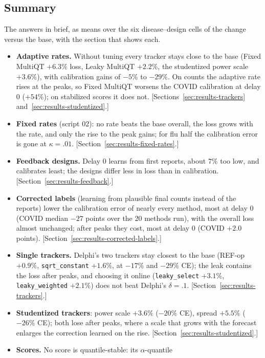 \documentclass[11pt,a4paper]{article}
\theoremstyle{definition}
\theoremstyle{remark}
\begin{document}
\subsection{Summary}
\label{sec:results-summary}
The answers in brief, as means over the six disease--design cells of the
change versus the base, with the section that shows each.
\begin{itemize}[leftmargin=*,itemsep=3pt]
\item \textbf{Adaptive rates.} Without tuning every tracker stays close to
the base (Fixed MultiQT $+6.3\%$ loss, Leaky MultiQT $+2.2\%$, the
studentized power scale $+3.6\%$), with calibration gains of $-5\%$ to
$-29\%$. On counts the adaptive rate rises at the peaks, so Fixed MultiQT
worsens the COVID calibration at delay 0 ($+54\%$); on stabilized scores it
does not. [Sections~\ref{sec:results-trackers}
and~\ref{sec:results-studentized}.]
\item \textbf{Fixed rates} (script 02): no rate beats the base overall,
the loss grows with the rate, and only the rise to the peak gains; for flu
half the calibration error is gone at $\kappa=.01$.
[Section~\ref{sec:results-fixed-rates}.]
\item \textbf{Feedback designs.} Delay 0 learns from first reports, about
$7\%$ too low, and calibrates least; the designs differ less in loss than
in calibration. [Section~\ref{sec:results-feedback}.]
\item \textbf{Corrected labels} (learning from plausible final counts
instead of the reports) lower the calibration error of nearly every method,
most at delay 0 (COVID median $-27$ points over the 20 methods run), with
the overall loss almost unchanged; after peaks they cost, most at delay 0
(COVID $+2.0$ points). [Section~\ref{sec:results-corrected-labels}.]
\item \textbf{Single trackers.} Delphi's two trackers stay closest to the
base (REF-op $+0.9\%$, \texttt{sqrt\_\allowbreak constant} $+1.6\%$, at $-17\%$ and
$-29\%$ CE); the leak contains the loss after peaks, and choosing it online
(\texttt{leaky\_select} $+3.1\%$, \texttt{leaky\_weighted} $+2.1\%$) does
not beat Delphi's $\delta=.1$. [Section~\ref{sec:results-trackers}.]
\item \textbf{Studentized trackers}: power scale $+3.6\%$ ($-20\%$ CE),
spread $+5.5\%$ ($-26\%$ CE); both lose after peaks, where a scale
that grows with the forecast enlarges the correction learned on the rise.
[Section~\ref{sec:results-studentized}.]
\item \textbf{Scores.} No score is quantile-stable: its $\alpha$-quantile

\end{itemize}
\end{document}
